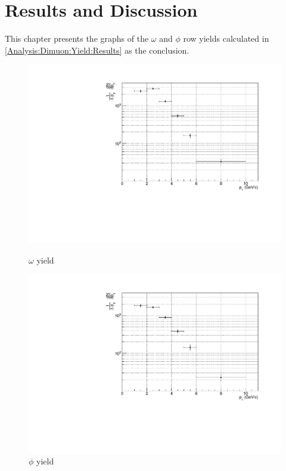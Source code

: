 \newpage
\clearpage
\section{Results and Discussion}
This chapter presents the graphs of the $\omega$ and $\phi$ row yields calculated in \ref{Analysis:Dimuon:Yield:Results} as the conclusion.
    \begin{figure}[htbp]
        \centering
        \begin{minipage}{0.45\textwidth} %
            \centering
            \includegraphics[width=\textwidth]{fig/4_omega_yield.pdf} %
            \caption{$\omega$ yield}
            \label{fig:omega_yield}
        \end{minipage}
        \hfill
        \begin{minipage}{0.45\textwidth}
            \centering
            \includegraphics[width=\textwidth]{fig/4_phi_yield.pdf} %
            \caption{$\phi$ yield}
            \label{fig:phi_yield}
        \end{minipage}
    \end{figure}

